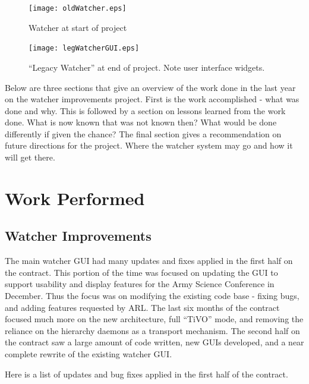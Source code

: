 \documentclass{report}
\begin{document}
\begin{figure}[htb]
\centering
\texttt{[image: oldWatcher.eps]}
\caption{Watcher at start of project}
\label{fig:oldWatcher}
\end{figure}

\begin{figure}[htb]
\label{fig:legWatcherGUI}
\centering
\texttt{[image: legWatcherGUI.eps]}
\caption{``Legacy Watcher'' at end of project. Note user interface widgets.}
\end{figure}

Below are three sections that give an overview of the work done in the last year on the watcher improvements project. First
is the work accomplished - what was done and why. This is followed by a section on lessons learned from the work done. What is now known 
that was not known then? What would be done differently if given the chance? The final section gives a recommendation on future directions
for the project. Where the watcher system may go and how it will get there. 

\section{Work Performed}

\subsection{Watcher Improvements}
The main watcher GUI had many updates and fixes applied in the first half on the contract. This portion of the time was focused on updating the GUI to 
support usability and display features for the Army Science Conference in December. Thus the focus was on modifying the existing code base - fixing bugs, 
and adding features requested by ARL. The last six months of the contract focused much more on the new architecture, full ``TiVO'' mode, and removing 
the reliance on the hierarchy daemons as a transport mechanism. The second half on the contract saw a large amount of code written, new GUIs developed, and 
a near complete rewrite of the existing watcher GUI. 

Here is a list of updates and bug fixes applied in the first half of the contract.
\end{document}
